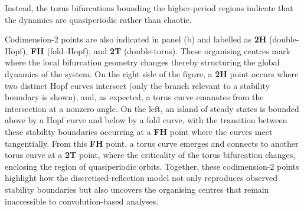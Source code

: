 Instead, the torus bifurcations bounding the higher-period regions indicate that the dynamics are quasiperiodic rather than chaotic.
%
\par
%
Codimension-2 points are also indicated in panel (b) and labelled as \textbf{2H} (double-Hopf), \textbf{FH} (fold–Hopf), and \textbf{2T} (double-torus).
These organising centres mark where the local bifurcation geometry changes thereby structuring the global dynamics of the system.
On the right side of the figure, a \textbf{2H} point occurs where two distinct Hopf curves intersect (only the branch relevant to a stability boundary is shown), and, as expected, a torus curve emanates from the intersection at a nonzero angle.
On the left, an island of steady states is bounded above by a Hopf curve and below by a fold curve, with the transition between these stability boundaries occurring at a \textbf{FH} point where the curves meet tangentially.
From this \textbf{FH} point, a torus curve emerges and connects to another torus curve at a \textbf{2T} point, where the criticality of the torus bifurcation changes, enclosing the region of quasiperiodic orbits.
Together, these codimension-2 points highlight how the discretised-reflection model not only reproduces observed stability boundaries but also uncovers the organising centres that remain inaccessible to convolution-based analyses.